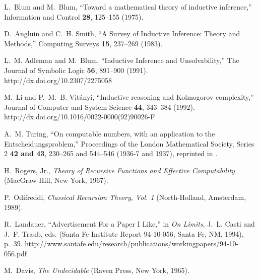 \documentclass[12pt]{article}
\begin{document}
\begin{thebibliography}{10}
L.~Blum and M.~Blum, \enquote{Toward a mathematical theory of inductive
  inference,} Information and Control {\bf 28}, 125--155 (1975).

D.~Angluin and C.~H. Smith, \enquote{A Survey of Inductive Inference: Theory
  and Methods,} Computing Surveys {\bf 15}, 237--269 (1983).

L.~M. Adleman and M.~Blum, \enquote{Inductive Inference and Unsolvability,} The
  Journal of Symbolic Logic {\bf 56}, 891--900 (1991).
\newline http://dx.doi.org/10.2307/2275058

M.~Li and P.~M.~B. Vit{\'{a}}nyi, \enquote{Inductive reasoning and {K}olmogorov
  complexity,} Journal of Computer and System Science {\bf 44}, 343--384
  (1992).
\newline http://dx.doi.org/10.1016/0022-0000(92)90026-F

A.~M. Turing, \enquote{On computable numbers, with an application to the
  {E}ntscheidungsproblem,} Proceedings of the London Mathematical Society,
  Series 2 {\bf 42 and 43}, 230--265 and 544--546 (1936-7 and 1937), reprinted
  in \cite{davis}.

H.~{Rogers, Jr.}, {\em Theory of Recursive Functions and Effective
  Computability\/} (MacGraw-Hill, New York, 1967).

P.~Odifreddi, {\em Classical Recursion Theory, Vol. 1\/} (North-Holland,
  Amsterdam, 1989).

R.~Landauer, \enquote{Advertisement For a Paper {I} Like,} in {\em On
  Limits\/}, J.~L. Casti and J.~F. Traub, eds.  (Santa Fe Institute Report
  94-10-056, Santa Fe, NM, 1994), p.~39.
\newline
  http://www.santafe.edu/research/publications/workingpapers/94-10-056.pdf

M.~Davis, {\em The Undecidable\/} (Raven Press, New York, 1965).

\end{thebibliography}
\end{document}
